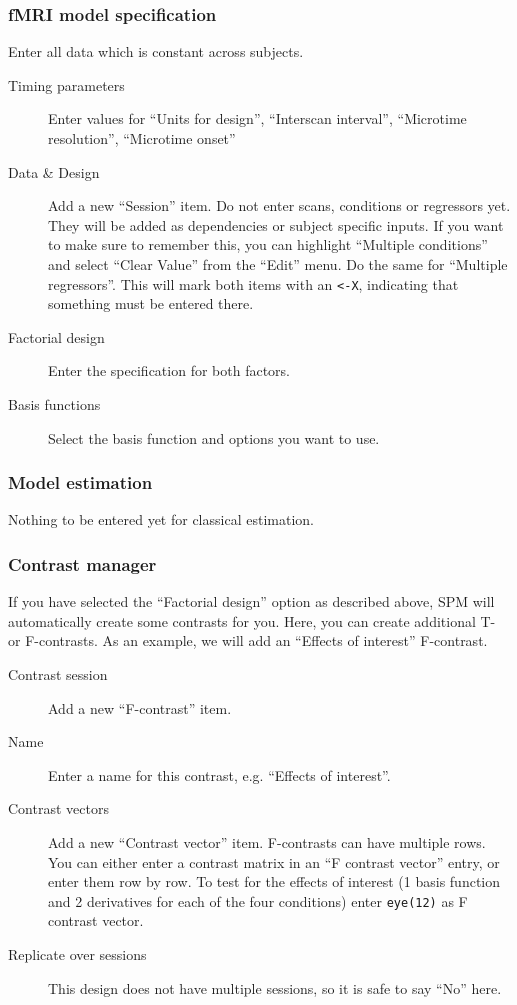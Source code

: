 \subsubsection*{fMRI model specification} 

Enter all data which is constant across subjects. 
\begin{description}
\item[Timing parameters] Enter values for ``Units for design'', ``Interscan
  interval'', ``Microtime resolution'', ``Microtime onset''
\item[Data \& Design] Add a new ``Session'' item. Do not enter scans,
  conditions or regressors yet. They will be added as dependencies or
  subject specific inputs. If you want to make sure to remember this, you
  can highlight ``Multiple conditions'' and select ``Clear Value'' from the
  ``Edit'' menu. Do the same for ``Multiple regressors''. This will mark
  both items with an \verb|<-X|, indicating that something must be entered
  there.
\item[Factorial design] Enter the specification for both factors.
\item[Basis functions] Select the basis function and options you want to use.
\end{description}

\subsubsection*{Model estimation}

Nothing to be entered yet for classical estimation.

\subsubsection*{Contrast manager} 

If you have selected the ``Factorial design'' option as described above, SPM
will automatically create some contrasts for you. Here, you can create
additional T- or F-contrasts. As an example, we will add an ``Effects of
interest'' F-contrast. 

\begin{description}
\item[Contrast session] Add a new ``F-contrast'' item.
\item[Name] Enter a name for this contrast, e.g. ``Effects of interest''.
\item[Contrast vectors] Add a new ``Contrast vector'' item. F-contrasts
  can have multiple rows. You can either enter a contrast matrix in an ``F
  contrast vector'' entry, or enter them row by row. To test for the
  effects of interest (1 basis function and 2 derivatives for each of the
  four conditions) enter \verb|eye(12)| as F contrast vector.
\item[Replicate over sessions] This design does not have multiple
  sessions, so it is safe to say ``No'' here.
\end{description}

